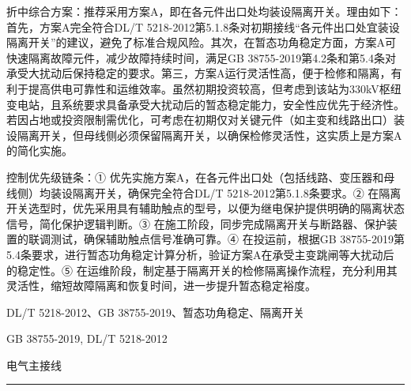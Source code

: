 \documentclass[12pt,a4paper]{ctexart}
\begin{document}
\begin{description}[leftmargin=1.5em,style=nextline,font=\normalfont]
折中综合方案：推荐采用方案A，即在各元件出口处均装设隔离开关。理由如下：首先，方案A完全符合DL/T 5218-2012第5.1.8条对初期接线“各元件出口处宜装设隔离开关”的建议，避免了标准合规风险。其次，在暂态功角稳定方面，方案A可快速隔离故障元件，减少故障持续时间，满足GB 38755-2019第4.2条和第5.4条对承受大扰动后保持稳定的要求。第三，方案A运行灵活性高，便于检修和隔离，有利于提高供电可靠性和运维效率。虽然初期投资较高，但考虑到该站为330kV枢纽变电站，且系统要求具备承受大扰动后的暂态稳定能力，安全性应优先于经济性。若因占地或投资限制需优化，可考虑在初期仅对关键元件（如主变和线路出口）装设隔离开关，但母线侧必须保留隔离开关，以确保检修灵活性，这实质上是方案A的简化实施。

控制优先级链条：① 优先实施方案A，在各元件出口处（包括线路、变压器和母线侧）均装设隔离开关，确保完全符合DL/T 5218-2012第5.1.8条要求。② 在隔离开关选型时，优先采用具有辅助触点的型号，以便为继电保护提供明确的隔离状态信号，简化保护逻辑判断。③ 在施工阶段，同步完成隔离开关与断路器、保护装置的联调测试，确保辅助触点信号准确可靠。④ 在投运前，根据GB 38755-2019第5.4条要求，进行暂态功角稳定计算分析，验证方案A在承受主变跳闸等大扰动后的稳定性。⑤ 在运维阶段，制定基于隔离开关的检修隔离操作流程，充分利用其灵活性，缩短故障隔离和恢复时间，进一步提升暂态稳定裕度。
  \item[KW:] DL/T 5218-2012、GB 38755-2019、暂态功角稳定、隔离开关
  \item[Std:] GB 38755-2019, DL/T 5218-2012
  \item[Topic:] 电气主接线
\end{description}
\vspace{4pt}
\hrule\vspace{6pt}
\end{document}
